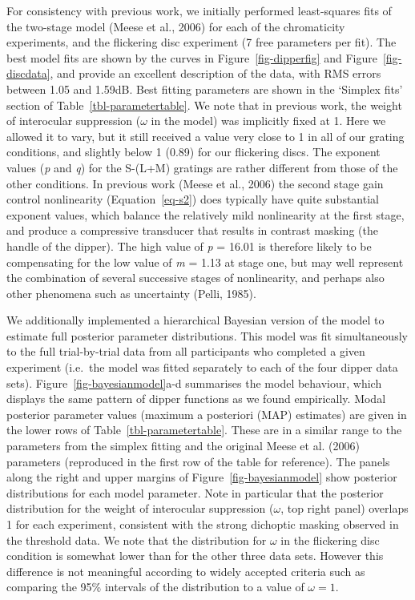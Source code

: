 \documentclass[
  letterpaper,
  DIV=11,
  numbers=noendperiod]{scrartcl}
\begin{document}
For consistency with previous work, we initially performed least-squares
fits of the two-stage model (Meese et al., 2006) for each of the
chromaticity experiments, and the flickering disc experiment (7 free
parameters per fit). The best model fits are shown by the curves in
Figure~\ref{fig-dipperfig} and Figure~\ref{fig-discdata}, and provide an
excellent description of the data, with RMS errors between 1.05 and
1.59dB. Best fitting parameters are shown in the `Simplex fits' section
of Table~\ref{tbl-parametertable}. We note that in previous work, the
weight of interocular suppression (\(\omega\) in the model) was
implicitly fixed at 1. Here we allowed it to vary, but it still received
a value very close to 1 in all of our grating conditions, and slightly
below 1 (0.89) for our flickering discs. The exponent values (\emph{p}
and \emph{q}) for the S-(L+M) gratings are rather different from those
of the other conditions. In previous work (Meese et al., 2006) the
second stage gain control nonlinearity (Equation~\ref{eq-s2}) does
typically have quite substantial exponent values, which balance the
relatively mild nonlinearity at the first stage, and produce a
compressive transducer that results in contrast masking (the handle of
the dipper). The high value of \emph{p} = 16.01 is therefore likely to
be compensating for the low value of \emph{m} = 1.13 at stage one, but
may well represent the combination of several successive stages of
nonlinearity, and perhaps also other phenomena such as uncertainty
(Pelli, 1985).

We additionally implemented a hierarchical Bayesian version of the model
to estimate full posterior parameter distributions. This model was fit
simultaneously to the full trial-by-trial data from all participants who
completed a given experiment (i.e.~the model was fitted separately to
each of the four dipper data sets). Figure~\ref{fig-bayesianmodel}a-d
summarises the model behaviour, which displays the same pattern of
dipper functions as we found empirically. Modal posterior parameter
values (maximum a posteriori (MAP) estimates) are given in the lower
rows of Table~\ref{tbl-parametertable}. These are in a similar range to
the parameters from the simplex fitting and the original Meese et al.
(2006) parameters (reproduced in the first row of the table for
reference). The panels along the right and upper margins of
Figure~\ref{fig-bayesianmodel} show posterior distributions for each
model parameter. Note in particular that the posterior distribution for
the weight of interocular suppression (\(\omega\), top right panel)
overlaps 1 for each experiment, consistent with the strong dichoptic
masking observed in the threshold data. We note that the distribution
for \(\omega\) in the flickering disc condition is somewhat lower than
for the other three data sets. However this difference is not meaningful
according to widely accepted criteria such as comparing the 95\%
intervals of the distribution to a value of \(\omega=1\).
\end{document}
